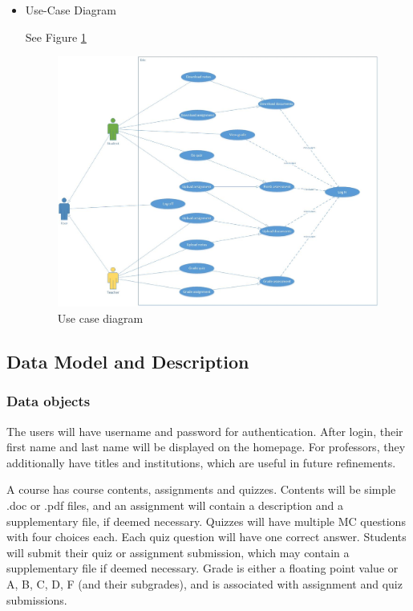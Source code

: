\documentclass[paper=a4, fontsize=11pt]{scrartcl}
\numberwithin{equation}{section}		%
\numberwithin{figure}{section}			%
\numberwithin{table}{section}				%
\begin{document}
\begin{itemize}
	\item Use-Case Diagram
	\par See Figure \ref{usecase}
	\begin{figure}[!ht]
		\begin{center}
			\includegraphics[width=\textwidth,height=\textheight,keepaspectratio]{usecase}
		\end{center}
		\caption{Use case diagram}
		\label{usecase}
	\end{figure}
	
\end{itemize}



\subsection{Data Model and Description}

\subsubsection{Data objects}
The users will have username and password for authentication. After login, their first name and last name will be displayed on the homepage. For professors, they additionally have titles and institutions, which are useful in future refinements.

A course has course contents, assignments and quizzes. Contents will be simple .doc or .pdf files, and an assignment will contain a description and a supplementary file, if deemed necessary. Quizzes will have multiple MC questions with four choices each. Each quiz question will have one correct answer. Students will submit their quiz or assignment submission, which may contain a supplementary file if deemed necessary. Grade is either a floating point value or A, B, C, D, F (and their subgrades), and is associated with assignment and quiz submissions.
\end{document}

